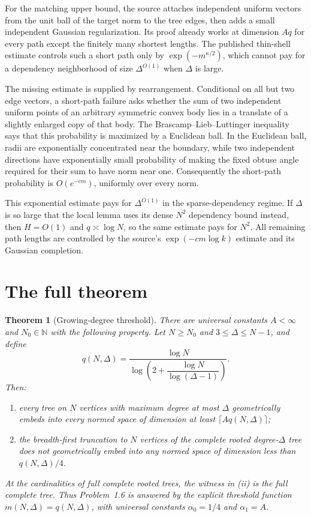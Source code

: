 \documentclass[11pt]{article}
\newtheorem{theorem}{Theorem}
\begin{document}
For the matching upper bound, the source attaches independent uniform vectors
from the unit ball of the target norm to the tree edges, then adds a small
independent Gaussian regularization. Its proof already works at dimension
$Aq$ for every path except the finitely many shortest lengths. The published
thin-shell estimate controls such a short path only by
$\exp(-m^{\kappa/2})$, which cannot pay for a dependency neighborhood of size
$\Delta^{O(1)}$ when $\Delta$ is large.

The missing estimate is supplied by rearrangement. Conditional on all but two
edge vectors, a short-path failure asks whether the sum of two independent
uniform points of an arbitrary symmetric convex body lies in a translate of a
slightly enlarged copy of that body. The Brascamp--Lieb--Luttinger inequality
says that this probability is maximized by a Euclidean ball. In the Euclidean
ball, radii are exponentially concentrated near the boundary, while two
independent directions have exponentially small probability of making the
fixed obtuse angle required for their sum to have norm near one. Consequently
the short-path probability is $O(e^{-cm})$, uniformly over every norm.

This exponential estimate pays for $\Delta^{O(1)}$ in the sparse-dependency
regime. If $\Delta$ is so large that the local lemma uses its dense $N^2$
dependency bound instead, then $H=O(1)$ and $q\asymp\log N$, so the same
estimate pays for $N^2$. All remaining path lengths are controlled by the
source's $\exp(-cm\log k)$ estimate and its Gaussian completion.

\section*{The full theorem}

\begin{theorem}[Growing-degree threshold]\label{thm:main}
There are universal constants $A<\infty$ and $N_0\in\mathbb N$ with the
following property. Let $N\geq N_0$ and $3\leq\Delta\leq N-1$, and define
\begin{equation}\label{eq:qdef}
 q(N,\Delta)=
 \frac{\log N}{
 \log\!\left(2+\dfrac{\log N}{\log(\Delta-1)}\right)}.
\end{equation}
Then:
\begin{enumerate}[label=(\roman*)]
 \item every tree on $N$ vertices with maximum degree at most $\Delta$
 geometrically embeds into every normed space of dimension at least
 $\lceil A q(N,\Delta)\rceil$;
 \item the breadth-first truncation to $N$ vertices of the complete rooted
 degree-$\Delta$ tree does not geometrically embed into any normed space of
 dimension less than $q(N,\Delta)/4$.
\end{enumerate}
At the cardinalities of full complete rooted trees, the witness in (ii) is
the full complete tree. Thus Problem~1.6 is answered by the explicit threshold
function $m(N,\Delta)=q(N,\Delta)$, with universal constants
$\alpha_0=1/4$ and $\alpha_1=A$.
\end{theorem}
\end{document}
